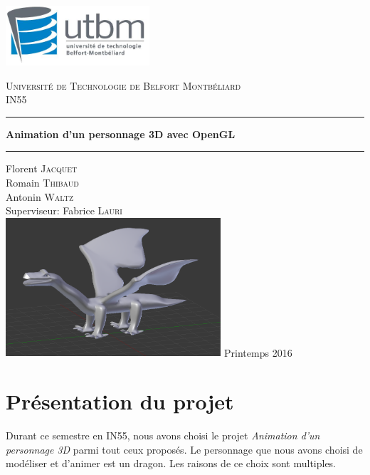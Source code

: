 \documentclass[a4paper]{report}
\begin{document}
\begin{titlepage}
    \includegraphics[width=0.4\textwidth]{logo_utbm.png}
    \begin{center}
        \textsc{\LARGE Université de Technologie de Belfort Montbéliard}\\[1cm]
        \textsc{\Large IN55}\\
        \rule{\linewidth}{0.5mm}
        { \huge \bfseries Animation d'un personnage 3D avec OpenGL\\[0.4cm] }
        \rule{\linewidth}{0.5mm}
        \vskip1cm
        Florent \textsc{Jacquet}\\
	Romain \textsc{Thibaud}\\
        Antonin \textsc{Waltz}\\
        Superviseur: Fabrice \textsc{Lauri}\\
        \vskip1cm
        \includegraphics[width=0.6\textwidth]{dragon_front_page.png}
        \vfill
        {\large Printemps 2016}
    \end{center}
\end{titlepage}

\newpage
\tableofcontents
\listoffigures
\newpage
\chapter{Présentation du projet}
\par

Durant ce semestre en IN55, nous avons choisi le projet \textit{Animation d'un personnage 3D} parmi tout ceux proposés. Le personnage que nous avons choisi de modéliser et d'animer est un dragon. Les raisons de ce choix sont multiples. 
\end{document}
